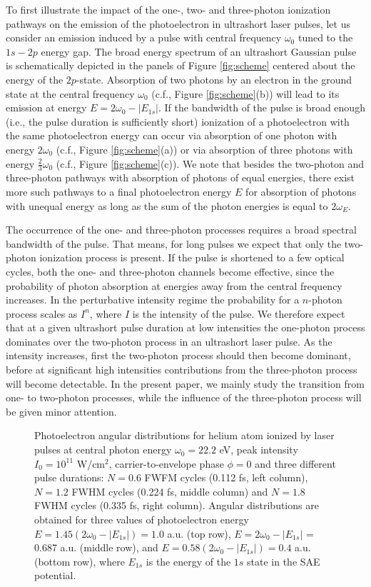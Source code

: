To first illustrate the impact of the one-, two- and three-photon ionization pathways on the emission of the photoelectron in ultrashort laser pulses, let us consider an emission induced by a pulse with central frequency $\omega_0$ tuned to the $1s-2p$ energy gap. The broad energy spectrum of an ultrashort Gaussian pulse is schematically depicted in the panels of Figure \ref{fig:scheme} centered about the energy of the $2p$-state. Absorption of two photons by an electron in the ground state at the central frequency $\omega_0$ (c.f., Figure \ref{fig:scheme}(b)) will lead to its emission at energy $E = 2\omega_0 - |E_{1s}|$. If the bandwidth of the pulse is broad enough (i.e., the pulse duration is sufficiently short) ionization of a photoelectron with the same photoelectron energy can occur via absorption of one photon with energy $2 \omega_0$ (c.f., Figure \ref{fig:scheme}(a)) or via absorption of three photons with energy $\frac{2}{3} \omega_0$ (c.f., Figure \ref{fig:scheme}(c)). We note that besides the two-photon and three-photon pathways with absorption of photons of equal energies, there exist more such pathways to a final photoelectron energy $E$ for absorption of photons with unequal energy as long as the sum of the photon energies is equal to $2 \omega_E$.

The occurrence of the one- and three-photon processes requires a broad spectral bandwidth of the pulse. That means, for long pulses we expect that only the two-photon ionization process is present. If the pulse is shortened to a few optical cycles, both the one- and three-photon channels become effective, since the probability of photon absorption at energies away from the central frequency increases. In the perturbative intensity regime the probability for a $n$-photon process scales as $I^n$, where $I$ is the intensity of the pulse. We therefore expect that at a given ultrashort pulse duration at low intensities the one-photon process dominates over the two-photon process in an ultrashort laser pulse. As the intensity increases, first the two-photon process should then become dominant, before at significant high intensities contributions from the three-photon process will become detectable. In the present paper, we mainly study the transition from one- to two-photon processes, while the influence of the three-photon process will be given minor attention. 

\begin{figure}[t]
\centering
\caption{
Photoelectron angular distributions for helium atom ionized by laser pulses at central photon energy $\omega_0 = 22.2$ eV, peak intensity $I_0 = 10^{11}$ W/cm$^2$, carrier-to-envelope phase $\phi = 0$ and three different pulse durations: $N = 0.6$ FWFM cycles (0.112 fs, left column), $N = 1.2$ FWHM cycles (0.224 fs, middle column) and $N = 1.8$ FWHM cycles (0.335 fs, right column). Angular distributions are obtained for three values of photoelectron energy $E = 1.45(2\omega_0 - |E_{1s}|) = 1.0$ a.u. (top row), $E = 2\omega_0 - |E_{1s}|$ = 0.687 a.u. (middle row), and $E = 0.58(2\omega_0 - |E_{1s}|) = 0.4$ a.u. (bottom row), where $E_{1s}$ is the energy of the $1s$ state in the SAE potential.
} 
  \label{fig:pads}
\end{figure}

